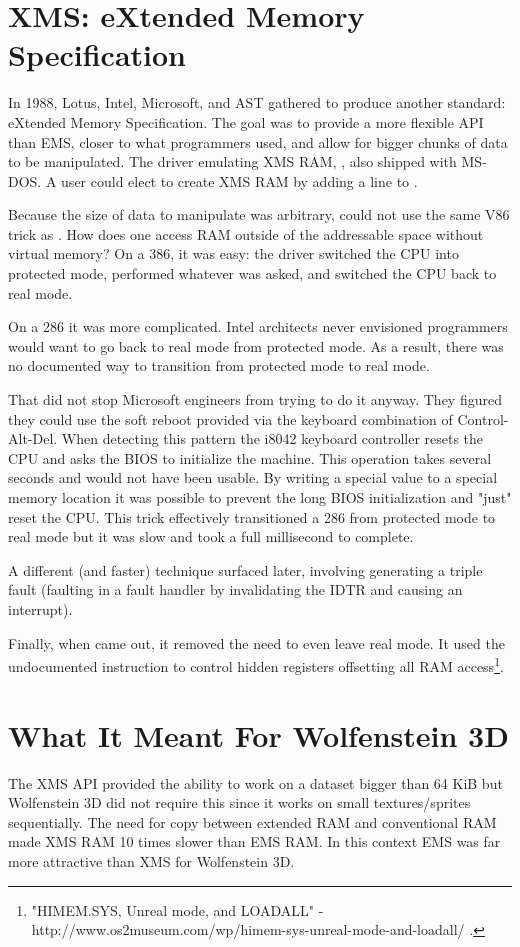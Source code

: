 \section{XMS: eXtended Memory Specification}
In 1988, Lotus, Intel, Microsoft, and AST gathered to produce another standard: eXtended Memory Specification. The goal was to provide a more flexible API than EMS, closer to what programmers used, and allow for bigger chunks of data to be manipulated. The driver emulating XMS RAM, , also shipped with MS-DOS. A user could elect to create XMS RAM by adding a line to .\\
\par
Because the size of data to manipulate was arbitrary,  could not use the same V86 trick as . How does one access RAM outside of the addressable space without virtual memory? On a 386, it was easy: the driver switched the CPU into protected mode, performed whatever was asked, and switched the CPU back to real mode.\\
\par
 On a 286 it was more complicated. Intel architects never envisioned programmers would want to go back to real mode from protected mode. As a result, there was no documented way to transition from protected mode to real mode.\\
 \par
  That did not stop Microsoft engineers from trying to do it anyway. They figured they could use the soft reboot provided via the keyboard combination of Control-Alt-Del. When detecting this pattern the i8042 keyboard controller resets the CPU and asks the BIOS to initialize the machine. This operation takes several seconds and would not have been usable. By writing a special value to a special memory location it was possible to prevent the long BIOS initialization and "just" reset the CPU. This trick effectively transitioned a 286 from protected mode to real mode but it was slow and took a full millisecond to complete.\\
 \par
  A different (and faster) technique surfaced later, involving generating a triple fault (faulting in a fault handler by invalidating the IDTR and causing an interrupt).\\
  \par
   Finally, when  came out, it removed the need to even leave real mode. It used the undocumented  instruction to control hidden registers offsetting all RAM access\footnote{"HIMEM.SYS, Unreal mode, and LOADALL" - http://www.os2museum.com/wp/himem-sys-unreal-mode-and-loadall/ .}.\\
\par
\section{What It Meant For Wolfenstein 3D}
The XMS API provided the ability to work on a dataset bigger than 64 KiB but Wolfenstein 3D did not require this since it works on small textures/sprites sequentially. The need for copy between extended RAM and conventional RAM made XMS RAM 10 times slower than EMS RAM. In this context EMS was far more attractive than XMS for Wolfenstein 3D.